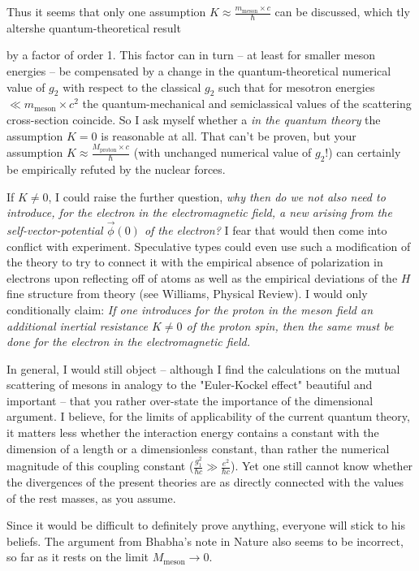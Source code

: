 Thus it seems that only one assumption $K\approx \frac{m_\text{meson}\times c}{\hbar}$ can be discussed, which  tly altershe quantum-theoretical result 

by a factor of order 1. This factor can in turn -- at least for smaller meson energies -- be compensated by a change in the quantum-theoretical numerical value of $g_2$ with respect to the classical $g_2$ such that for mesotron energies $\ll m_\text{meson}\times c^2$ the quantum-mechanical and semiclassical values of the scattering cross-section coincide. So I ask myself whether a
\textit{in the quantum theory} the assumption $K=0$ is reasonable at all. That can't be proven, but your assumption $K\approx\frac{M_\text{proton}\times c}{\hbar}$ (with unchanged numerical value of $g_2$!) can certainly be empirically refuted by the nuclear forces.

If $K\neq 0$, I could raise the further question, \textit{why then do we not also need to introduce, for the electron in the electromagnetic field, a new  arising from the self-vector-potential $\vec{\phi}(0)$ of the electron?} I fear that would then come into conflict with experiment. Speculative types could even use such a modification of the theory to try to connect it with the empirical absence of polarization in electrons upon reflecting off of atoms as well as the empirical deviations of the $H$ fine structure from theory (see Williams, Physical Review). I would only conditionally claim: \textit{If one introduces for the proton in the meson field an additional inertial resistance $K\neq 0$ of the proton spin, then the same must be done for the electron in the electromagnetic field.}

In general, I would still object -- although I find the calculations on the mutual scattering of mesons in analogy to the "Euler-Kockel effect" beautiful and important -- that you rather over-state the importance of the dimensional argument. I believe, for the limits of applicability of the current quantum theory, it matters less whether the interaction energy contains a constant with the dimension of a length or a dimensionless constant, than rather the numerical magnitude of this coupling constant ($\frac{g_1^2}{\hbar c} \gg \frac{e^2}{\hbar c}$). Yet one still cannot know whether the divergences of the present theories are as directly connected with the values of the rest masses, as you assume.

Since it would be difficult to definitely prove anything, everyone will stick to his beliefs. The argument from Bhabha's note in Nature also seems to be incorrect, so far as it rests on the limit $M_\text{meson} \to 0$.

